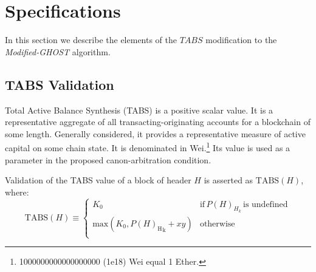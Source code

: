 \documentclass[11pt]{article}
\theoremstyle{plain}
\newcommand{\mghost}{\textit{Modified-GHOST }}
\begin{document}




\pagebreak
\section{\normalsize{Specifications}}\label{sec: specs}

In this section we describe the elements of the $TABS$ modification to the
\mghost algorithm.

\subsection{\small{TABS Validation}}


Total Active Balance Synthesis (TABS) is a positive scalar value.
It is a representative aggregate of all transacting-originating accounts for a blockchain of some length.
Generally considered, it provides a representative measure of active capital on some chain state.
It is denominated in Wei.\footnote{
    1000000000000000000 (1e18) Wei equal 1 Ether. %
}
Its value is used as a parameter in the proposed canon-arbitration condition.

\newcommand{\minTABS}{K_0}
\newcommand{\mynumerator}{y}
\newcommand{\tabsAdjustmentDenominator}{r}
\newcommand{\diffadjustment}{x}

Validation of the TABS value of a block of header $H$ is asserted as
$\mathrm{TABS}(H)$, \\

where:
\begin{equation}
\mathrm{TABS}(H) \equiv \begin{cases}

\minTABS & \text{if} \, P(H)_{H_k} \, \text{is undefined} \\

\text{max}\!\left(\minTABS, {P(H)_{\mathrm{H}}}_{\mathrm{k}} +
\diffadjustment \mynumerator \right) & \text{otherwise} \\
\end{cases}
\end{equation}
\end{document}
